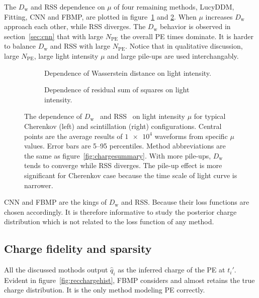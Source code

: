 The $D_\mathrm{w}$ and RSS dependence on $\mu$ of four remaining methods, LucyDDM, Fitting, CNN and FBMP, are plotted in figure~\ref{fig:wdistsummary} and \ref{fig:rsssummary}.  When $\mu$ increases $D_\mathrm{w}$ approach each other, while RSS diverges.  The $D_\mathrm{w}$ behavior is observed in section~\ref{sec:cnn} that with large $N_\mathrm{PE}$ the overall PE times dominate.  It is harder to balance $D_\mathrm{w}$ and RSS with large $N_\mathrm{PE}$.  Notice that in qualitative discussion, large $N_\mathrm{PE}$, large light intensity $\mu$ and large pile-ups are used interchangably.
\begin{figure}[H]
  \begin{subfigure}[b]{\textwidth}
    \resizebox{\textwidth}{!}{}
    \caption{\label{fig:wdistsummary}Dependence of Wasserstein distance on light intensity.}
  \end{subfigure}

  \vspace{0.5em}
  \begin{subfigure}[b]{\textwidth}
    \resizebox{\textwidth}{!}{}
    \caption{\label{fig:rsssummary}Dependence of residual sum of squares on light intensity.}
  \end{subfigure}
  \caption{\label{fig:summary}The dependence of $D_\mathrm{w}$~ and RSS~ on light intensity $\mu$ for typical Cherenkov (left) and scintillation (right) configurations.  Central points are the average results of $\num[retain-unity-mantissa=false]{1e4}$ waveforms from specific $\mu$ values.  Error bars are 5--95 percentiles.  Method abbreviations are the same as figure~\ref{fig:chargesummary}.  With more pile-ups, $D_\mathrm{w}$ tends to converge while RSS diverges.  The pile-up effect is more significant for Cherenkov case because the time scale of light curve is narrower. }
\end{figure}

CNN and FBMP are the kings of $D_\mathrm{w}$ and RSS.  Because their loss functions are chosen accordingly.  It is therefore informative to study the posterior charge distribution which is not related to the loss function of any method.

\subsection{Charge fidelity and sparsity}

All the discussed mothods output $\hat{q}_i$ as the inferred charge of the PE at $t_i'$.  Evident in figure~\ref{fig:recchargehist}, FBMP considers and almost retains the true charge distribution.  It is the only method modeling PE correctly.

